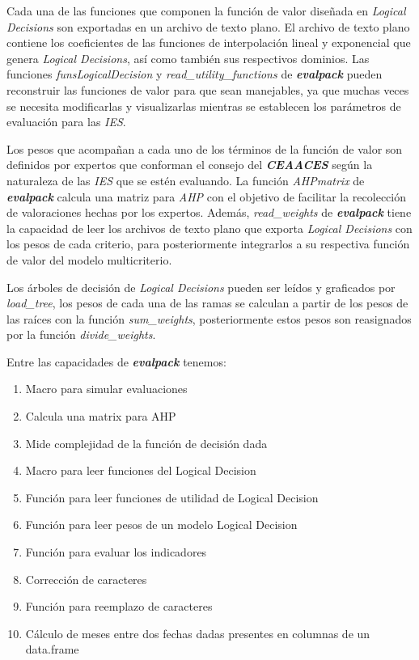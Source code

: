 Cada una de las funciones que componen la función de valor diseñada en {\it Logical
Decisions\textregistered } son exportadas en un archivo de texto plano. El archivo de texto plano
contiene los coeficientes de las funciones de interpolación lineal y exponencial que genera {\it
Logical Decisions\textregistered }, así como también sus respectivos dominios. Las funciones {\it
funsLogicalDecision} y {\it read\_utility\_functions} de \textit{\textbf{evalpack}} pueden
reconstruir las funciones de valor para que sean manejables, ya que muchas veces se necesita
modificarlas y visualizarlas mientras se establecen los parámetros de evaluación para las {\it IES}.

Los pesos que acompañan a cada uno de los términos de la función de valor son definidos por expertos
que conforman el consejo del \textit{\textbf{CEAACES}} según la naturaleza de las {\it IES} que se
estén evaluando. La función {\it AHPmatrix} de \textit{\textbf{evalpack}} calcula una matriz para
{\it AHP} con el objetivo de facilitar la recolección de  valoraciones hechas por los expertos.
Además, {\it read\_weights} de \textit{\textbf{evalpack}} tiene la capacidad de leer los archivos de
texto plano que exporta {\it Logical Decisions\textregistered } con los pesos de cada criterio, para
posteriormente integrarlos a su respectiva función de valor del modelo multicriterio.  

Los árboles de decisión de {\it Logical Decisions\textregistered } pueden ser leídos y graficados
por {\it load\_tree}, los pesos de cada una de las ramas se calculan a partir de los pesos de las
raíces con la función {\it sum\_weights}, posteriormente estos pesos son reasignados por la función
{\it divide\_weights}.     

Entre las capacidades de \textit{\textbf{evalpack}} tenemos:
\begin{enumerate}
\item Macro para simular evaluaciones
\item Calcula una matrix para AHP
\item Mide complejidad de la función de decisión dada
\item Macro para leer funciones del Logical Decision
\item Función para leer funciones de utilidad de Logical Decision
\item Función para leer pesos de un modelo Logical Decision
\item Función para evaluar los indicadores
\item Corrección de caracteres 
\item Función para reemplazo de caracteres
\item Cálculo de meses entre dos fechas dadas presentes en columnas de un data.frame
\end{enumerate}


